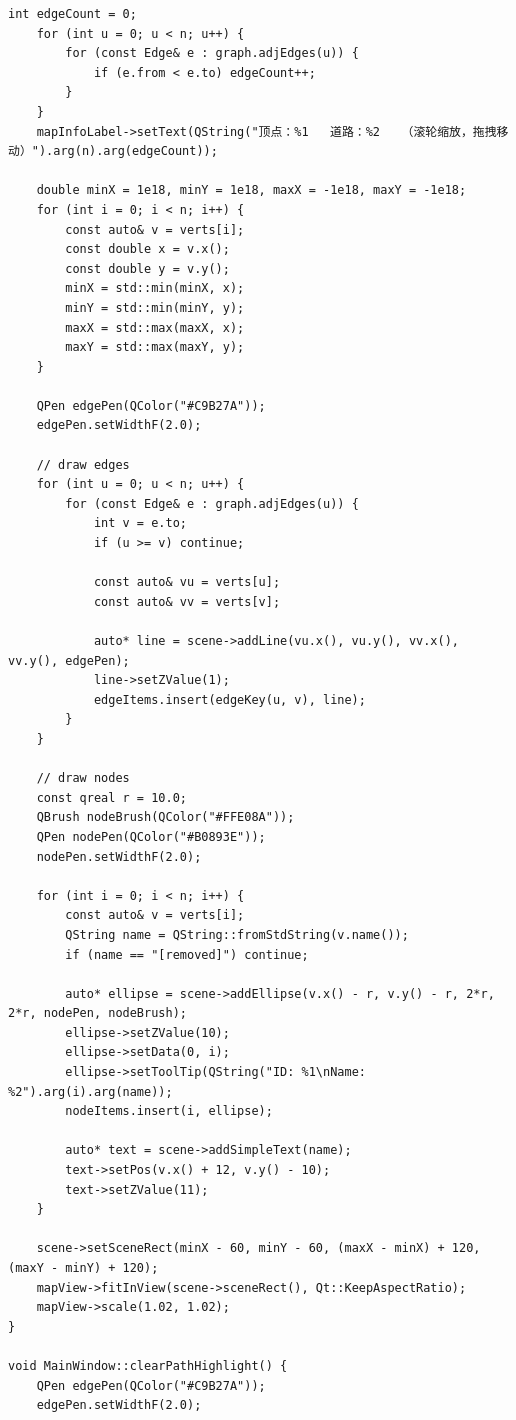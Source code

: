 \documentclass[UTF8,12pt,a4paper]{ctexart}
\begin{document}
\begin{lstlisting}[caption={mainwindow.cpp 源码}]
    int edgeCount = 0;
    for (int u = 0; u < n; u++) {
        for (const Edge& e : graph.adjEdges(u)) {
            if (e.from < e.to) edgeCount++;
        }
    }
    mapInfoLabel->setText(QString("顶点：%1   道路：%2   （滚轮缩放，拖拽移动）").arg(n).arg(edgeCount));

    double minX = 1e18, minY = 1e18, maxX = -1e18, maxY = -1e18;
    for (int i = 0; i < n; i++) {
        const auto& v = verts[i];
        const double x = v.x();
        const double y = v.y();
        minX = std::min(minX, x);
        minY = std::min(minY, y);
        maxX = std::max(maxX, x);
        maxY = std::max(maxY, y);
    }

    QPen edgePen(QColor("#C9B27A"));
    edgePen.setWidthF(2.0);

    // draw edges
    for (int u = 0; u < n; u++) {
        for (const Edge& e : graph.adjEdges(u)) {
            int v = e.to;
            if (u >= v) continue;

            const auto& vu = verts[u];
            const auto& vv = verts[v];

            auto* line = scene->addLine(vu.x(), vu.y(), vv.x(), vv.y(), edgePen);
            line->setZValue(1);
            edgeItems.insert(edgeKey(u, v), line);
        }
    }

    // draw nodes
    const qreal r = 10.0;
    QBrush nodeBrush(QColor("#FFE08A"));
    QPen nodePen(QColor("#B0893E"));
    nodePen.setWidthF(2.0);

    for (int i = 0; i < n; i++) {
        const auto& v = verts[i];
        QString name = QString::fromStdString(v.name());
        if (name == "[removed]") continue;

        auto* ellipse = scene->addEllipse(v.x() - r, v.y() - r, 2*r, 2*r, nodePen, nodeBrush);
        ellipse->setZValue(10);
        ellipse->setData(0, i);
        ellipse->setToolTip(QString("ID: %1\nName: %2").arg(i).arg(name));
        nodeItems.insert(i, ellipse);

        auto* text = scene->addSimpleText(name);
        text->setPos(v.x() + 12, v.y() - 10);
        text->setZValue(11);
    }

    scene->setSceneRect(minX - 60, minY - 60, (maxX - minX) + 120, (maxY - minY) + 120);
    mapView->fitInView(scene->sceneRect(), Qt::KeepAspectRatio);
    mapView->scale(1.02, 1.02);
}

void MainWindow::clearPathHighlight() {
    QPen edgePen(QColor("#C9B27A"));
    edgePen.setWidthF(2.0);


\end{lstlisting}
\end{document}
